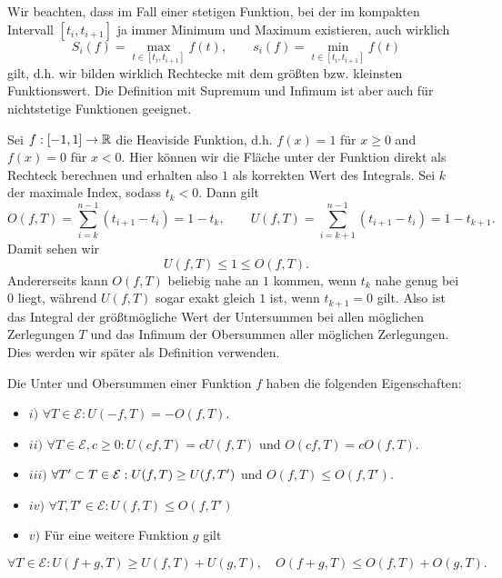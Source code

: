 Wir beachten, dass im Fall einer stetigen Funktion, bei der im kompakten Intervall \([t_i,t_{i+1}]\) ja immer Minimum und Maximum existieren, auch wirklich
\begin{equation*}
 S_i(f) =  \max_{t \in  [t_i,t_{i+1}]} f(t), \qquad s_i(f) =  \min_{t \in  [t_i,t_{i+1}]} f(t)
\end{equation*}
gilt, d.h. wir bilden wirklich Rechtecke mit dem größten bzw. kleinsten Funktionswert. Die Definition mit Supremum und Infimum ist aber auch für nichtstetige Funktionen geeignet.
\label{integration/integration:example-0}
\begin{example}{}{}



Sei \(f:[-1,1] \rightarrow \mathbb{R}\) die Heaviside Funktion, d.h. \(f(x) =1 \) für \(x \geq 0\) and \(f(x) = 0\) für \(x < 0\). Hier können wir die Fläche unter der Funktion direkt als Rechteck berechnen und erhalten also \(1\) als korrekten Wert des Integrals.
Sei \(k\) der maximale Index, sodass \(t_k < 0\). Dann gilt
\begin{equation*}
  O(f,T) = \sum_{i=k}^{n-1} (t_{i+1} - t_i) = 1 - t_k, \qquad U(f,T) = \sum_{i=k+1}^{n-1} (t_{i+1} - t_i) = 1 - t_{k+1}.\end{equation*}
Damit sehen wir
\begin{equation*}
 U(f,T) \leq 1 \leq O(f,T).
\end{equation*}
Andererseits kann \(O(f,T)\) beliebig nahe an \(1\) kommen, wenn \(t_k\) nahe genug bei \(0\) liegt, während \(U(f,T)\) sogar exakt gleich \(1\) ist, wenn \(t_{k+1} = 0\) gilt. Also ist das Integral der größtmögliche Wert der Untersummen bei allen möglichen Zerlegungen \(T\) und das Infimum der Obersummen aller möglichen Zerlegungen. Dies werden wir später als Definition verwenden.
\end{example}
\label{integration/integration:lemma-1}
\begin{lemma}{}{}



Die Unter  und Obersummen einer Funktion \(f\) haben die folgenden Eigenschaften:
\begin{itemize}
\item {} 
\(i)\) \(\forall T \in {\mathcal E}: U(-f,T) = - O(f,T)\).

\item {} 
\(ii)\) \(\forall T \in {\mathcal E}, c \geq 0: U(cf,T) = c U(f,T)\) und \(O(cf,T) = c O(f,T).\)

\item {} 
\(iii)\) \(\forall T' \subset T \in {\cal E}: U(f,T) \geq U(f,T')\) und \(O(f,T) \leq O(f,T')\).

\item {} 
\(iv)\) \(\forall T, T' \in {\mathcal E}: U(f,T) \leq O(f,T')\)

\item {} 
\(v)\) Für eine weitere Funktion \(g\) gilt

\end{itemize}
\begin{equation*}
\forall T \in {\mathcal E}: U(f+g,T) \geq U(f,T) + U(g,T), \quad O(f+g,T) \leq O(f,T) + O(g,T).
\end{equation*}\end{lemma}

